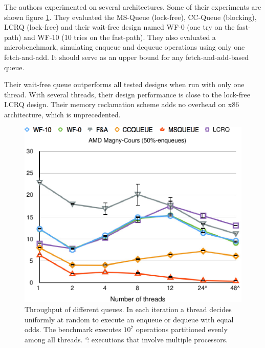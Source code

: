 


The authors experimented on several architectures. Some of their experiments are
shown figure \ref{fig:courbe}. They evaluated the MS-Queue (lock-free), CC-Queue
(blocking), LCRQ (lock-free) and their wait-free design named WF-0 (one try on
the fast-path) and WF-10 (10 tries on the fast-path). They also evaluated a
microbenchmark, simulating enqueue and dequeue operations using only one
fetch-and-add. It should serve as an upper bound for any fetch-and-add-based
queue.

Their wait-free queue outperforms all tested designs when run with only one
thread. With several threads, their design performance is close to the lock-free
LCRQ design. Their memory reclamation scheme adds no overhead on x86
architecture, which is unprecedented.

\begin{figure}
    \caption{
    Throughput of different queues. In each iteration a thread decides uniformly
    at random to execute an enqueue or dequeue with equal odds. The benchmark
    executes $10^7$ operations partitioned evenly among all threads. \char`\^:
    executions that involve multiple processors.
    \cite{Yang:2016:WQF:3016078.2851168}}
    \label{fig:courbe}
    \center
    \includegraphics[width=1\linewidth]{img/courbe.pdf}
\end{figure}

